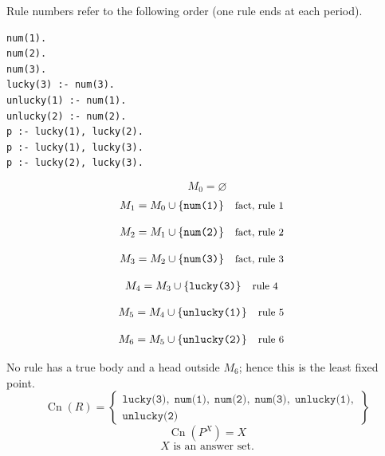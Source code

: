 \documentclass[a4paper,11pt]{article}
\newif\ifexplain
\newcommand{\explain}[1]{\ifexplain\begin{erklbox}#1\end{erklbox}\fi}
\newcommand{\why}[1]{\text{\small #1}}
\newcommand{\at}[1]{\texttt{#1}}
\begin{document}
Rule numbers refer to the following order (one rule ends at each period).
\begin{small}
\begin{verbatim}
num(1).
num(2).
num(3).
lucky(3) :- num(3).
unlucky(1) :- num(1).
unlucky(2) :- num(2).
p :- lucky(1), lucky(2).
p :- lucky(1), lucky(3).
p :- lucky(2), lucky(3).
\end{verbatim}
\end{small}
\explain{Beim Redukt bleibt die Kandidatenmenge fest. Wir entscheiden zuerst, welche Regeln wegfallen. Erst danach berechnen wir aus den verbleibenden positiven Regeln die kleinste abgeschlossene Menge. Ein Modell allein reicht nicht: Diese Menge muss genau der Kandidat sein.}
\[
M_0=\varnothing
\]
\begin{align*}
M_{1} &= M_{0}\cup \{\at{num(1)}\} && \why{fact, rule 1}
\end{align*}
\explain{Diese Regel hat keinen Körper. Ihr Kopf $\at{num(1)}$ ist damit ein Fakt und muss in die Menge.}
\begin{align*}
M_{2} &= M_{1}\cup \{\at{num(2)}\} && \why{fact, rule 2}
\end{align*}
\explain{Diese Regel hat keinen Körper. Ihr Kopf $\at{num(2)}$ ist damit ein Fakt und muss in die Menge.}
\begin{align*}
M_{3} &= M_{2}\cup \{\at{num(3)}\} && \why{fact, rule 3}
\end{align*}
\explain{Diese Regel hat keinen Körper. Ihr Kopf $\at{num(3)}$ ist damit ein Fakt und muss in die Menge.}
\begin{align*}
M_{4} &= M_{3}\cup \{\at{lucky(3)}\} && \why{rule 4}
\end{align*}
\explain{Für $\at{lucky(3)}$ brauchen wir $\at{num(3)}$. Weil diese Voraussetzungen bereits hergeleitet sind, dürfen wir den Regelkopf jetzt aufnehmen und alle bisherigen Atome behalten; bei einer fehlenden Voraussetzung würde diese Regel dagegen noch nichts beitragen.}
\begin{align*}
M_{5} &= M_{4}\cup \{\at{unlucky(1)}\} && \why{rule 5}
\end{align*}
\explain{Für $\at{unlucky(1)}$ brauchen wir $\at{num(1)}$. Weil diese Voraussetzungen bereits hergeleitet sind, dürfen wir den Regelkopf jetzt aufnehmen und alle bisherigen Atome behalten; bei einer fehlenden Voraussetzung würde diese Regel dagegen noch nichts beitragen.}
\begin{align*}
M_{6} &= M_{5}\cup \{\at{unlucky(2)}\} && \why{rule 6}
\end{align*}
\explain{Für $\at{unlucky(2)}$ brauchen wir $\at{num(2)}$. Weil diese Voraussetzungen bereits hergeleitet sind, dürfen wir den Regelkopf jetzt aufnehmen und alle bisherigen Atome behalten; bei einer fehlenden Voraussetzung würde diese Regel dagegen noch nichts beitragen.}
No rule has a true body and a head outside $M_{6}$; hence this is the least fixed point.
\[
\operatorname{Cn}(R)=\left\{\begin{gathered}\at{lucky(3)},\;\at{num(1)},\;\at{num(2)},\;\at{num(3)},\;\at{unlucky(1)},\\\at{unlucky(2)}\end{gathered}\right\}
\]
\[
\operatorname{Cn}(P^X)=X
\]
\[
\boxed{X\text{ is an answer set.}}
\]
\end{document}

